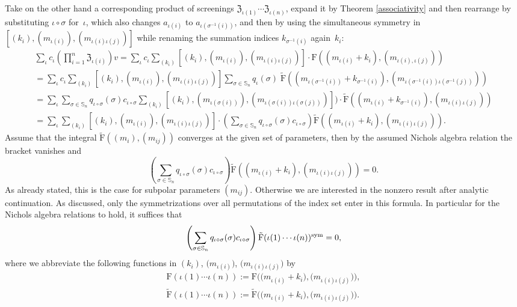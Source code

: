 \documentclass[10pt,a4paper]{amsart}
\numberwithin{equation}{section}
\renewcommand{\S}{\mathbb{S}}
\newcommand{\zem}{\mathfrak{Z}}
\newcommand{\Fp}{\mathrm{F}}
\newcommand{\rFp}{\tilde{\mathrm{F}}}
\begin{document}
Take on the other hand a corresponding product of screenings $\zem_{\iota(1)}\cdots \zem_{\iota(n)}$, expand it by Theorem \ref{associativity} and then rearrange by substituting $\iota\circ\sigma$ for~$\iota$, which also changes $a_{\iota(i)}$ to $a_{\iota(\sigma^{-1}(i))}$, and then by using the simultaneous symmetry in $[(k_i),(m_{\iota(i)}),(m_{\iota(i)\iota(j)})]$ while renaming the summation indices $k_{\sigma^{-1}(i)}$ again~$k_i$:
 \begin{gather*}
\sum_{\iota} c_{\iota}\left(\prod_{i=1}^n \zem_{\iota(i)}\right)  v
=\sum_\iota c_\iota \sum_{(k_{i})} [(k_i),(m_{\iota(i)}),(m_{\iota(i)\iota(j)})]\cdot \Fp((m_{\iota(i)}+k_i),(m_{\iota(i),\iota(j)})) \\
=\sum_\iota c_\iota \sum_{(k_{i})} [(k_i),(m_{\iota(i)}),(m_{\iota(i)\iota(j)})]
\sum_{\sigma\in \S_n} q_{\iota}(\sigma)\;\rFp((m_{\iota(\sigma^{-1}(i))}+k_{\sigma^{-1}(i)}),(m_{\iota(\sigma^{-1}(i))\iota(\sigma^{-1}(j))}))\\
=\sum_\iota\sum_{\sigma\in \S_n} q_{\iota\circ\sigma}(\sigma) c_{\iota\circ\sigma} \sum_{(k_{i})} [(k_i),(m_{\iota(\sigma(i))}),(m_{\iota(\sigma(i))\iota(\sigma(j))})]
)\cdot\rFp((m_{\iota(i)}+k_{\sigma^{-1}(i)}),(m_{\iota(i)\iota(j)}))\\
=\sum_\iota\sum_{(k_{i})} [(k_{i}),(m_{\iota(i)}),(m_{\iota(i)\iota(j)})]
\cdot\left(\sum_{\sigma\in \S_n} q_{\iota\circ\sigma}(\sigma) c_{\iota\circ\sigma} \right)\rFp((m_{\iota(i)}+k_{i}),(m_{\iota(i)\iota(j)})).
\end{gather*}
Assume that the integral $\rFp((m_i),(m_{ij}))$ converges at the given set of parameters, then by the assumed Nichols algebra relation the bracket vanishes and
\[\left(\sum_{\sigma\in \S_n} q_{\iota\circ\sigma}(\sigma) c_{\iota\circ\sigma} \right)\rFp((m_{\iota(i)}+k_{i}),(m_{\iota(i)\iota(j)}))=0.\]
As already stated, this is the case for subpolar parameters $(m_{ij})$. Otherwise we are interested in the nonzero result after analytic continuation. As discussed, only the symmetrizations over all permutations of the index set enter in this formula. In particular for the Nichols algebra relations to hold, it suffices that
\[\left(\sum_{\sigma\in \S_n} q_{\iota\circ\sigma}(\sigma) c_{\iota\circ\sigma} \right)\rFp(\iota(1)\cdots\iota(n))^{{\rm sym}}=0,\]
where we abbreviate the following functions in $(k_i)$, $\big(m_{\iota(i)}\big)$, $\big(m_{\iota(i)\iota(j)}\big)$ by
\begin{gather*}
\Fp(\iota(1)\cdots\iota(n)):=\Fp\big(\big(m_{\iota(i)}+k_{i}\big),\big(m_{\iota(i)\iota(j)}\big)\big),\\
\rFp(\iota(1)\cdots\iota(n)):=\rFp\big(\big(m_{\iota(i)}+k_{i}\big),\big(m_{\iota(i)\iota(j)}\big)\big).
\end{gather*}
\end{document}
